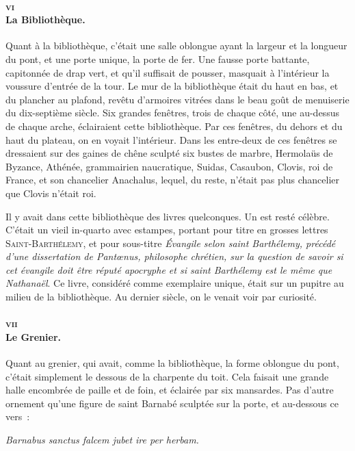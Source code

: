\documentclass[french,twoside]{book} %
\begin{document}
\paragraph[{vi La Bibliothèque.}]{\textsc{vi} \\
La Bibliothèque.}
\label{p3l2c9p6}
\noindent Quant à la bibliothèque, c’était une salle oblongue ayant la largeur et la longueur du pont, et une porte unique, la porte de fer. Une fausse porte battante, capitonnée de drap vert, et qu’il suffisait de pousser, masquait à l’intérieur la voussure d’entrée de la tour. Le mur de la bibliothèque était du haut en bas, et du plancher au plafond, revêtu d’armoires vitrées dans le beau goût de menuiserie du dix-septième siècle. Six grandes fenêtres, trois de chaque côté, une au-dessus  de chaque arche, éclairaient cette bibliothèque. Par ces fenêtres, du dehors et du haut du plateau, on en voyait l’intérieur. Dans les entre-deux de ces fenêtres se dressaient sur des gaines de chêne sculpté six bustes de marbre, Hermolaüs de Byzance, Athénée, grammairien naucratique, Suidas, Casaubon, Clovis, roi de France, et son chancelier Anachalus, lequel, du reste, n’était pas plus chancelier que Clovis n’était roi.\par
Il y avait dans cette bibliothèque des livres quelconques. Un est resté célèbre. C’était un vieil in-quarto avec estampes, portant pour titre en grosses lettres S{\scshape aint}-B{\scshape arthélemy}, et pour sous-titre \emph{Évangile selon saint Barthélemy, précédé d’une dissertation de Pantœnus, philosophe chrétien, sur la question de savoir si cet évangile doit être réputé apocryphe et si saint Barthélemy est le même que Nathanaël}. Ce livre, considéré comme exemplaire unique, était sur un pupitre au milieu de la bibliothèque. Au dernier siècle, on le venait voir par curiosité.
\paragraph[{vii Le Grenier.}]{\textsc{vii} \\
Le Grenier.}
\label{p3l2c9p7}
\noindent Quant au grenier, qui avait, comme la bibliothèque, la forme oblongue du pont, c’était simplement le dessous de la charpente du toit. Cela faisait une grande halle encombrée de paille et de foin, et éclairée par six mansardes. Pas d’autre ornement qu’une  figure de saint Barnabé sculptée sur la porte, et au-dessous ce vers :\par

\emph{Barnabus sanctus falcem jubet ire per herbam.}\\
\end{document}
